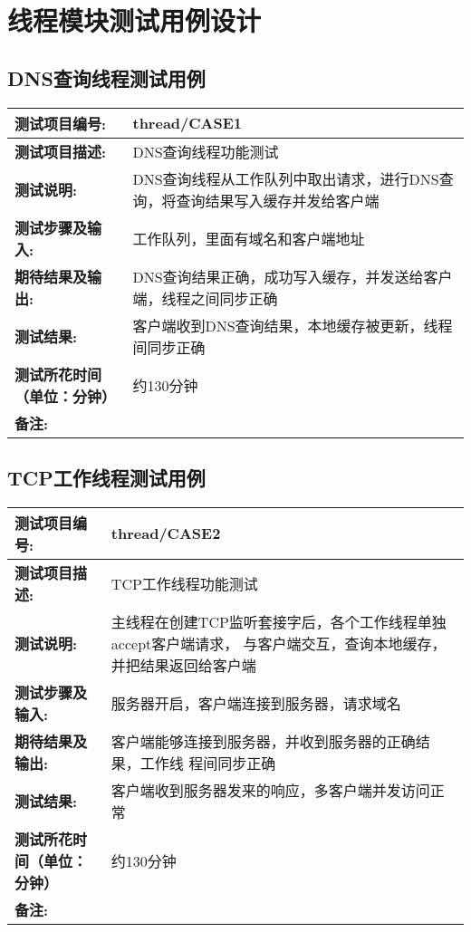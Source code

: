 %
%
\section{线程模块测试用例设计}
\subsection{DNS查询线程测试用例}

\begin{table}[H]
\centering
\begin{tabular}{|p{8em}|p{22em}|}
\hline
\textbf{测试项目编号:}&thread/CASE1\\
\hline
\textbf{测试项目描述:}&DNS查询线程功能测试\\
\hline
\textbf{测试说明:}& DNS查询线程从工作队列中取出请求，进行DNS查询，将查询结果写入缓存并发给客户端\\
\hline
\textbf{测试步骤及输入:}&工作队列，里面有域名和客户端地址\\
\hline
\textbf{期待结果及输出:}&DNS查询结果正确，成功写入缓存，并发送给客户端，线程之间同步正确\\
\hline
\textbf{测试结果:}& 客户端收到DNS查询结果，本地缓存被更新，线程间同步正确\\
\hline
\textbf{测试所花时间（单位：分钟）}& 约130分钟\\
\hline
\textbf{备注:}& \\
\hline
\end{tabular}
\end{table}

\subsection {TCP工作线程测试用例}
\begin{table}[H]
\centering
\begin{tabular}{|p{8em}|p{22em}|}
\hline
\textbf{测试项目编号:}&thread/CASE2\\
\hline
\textbf{测试项目描述:}&TCP工作线程功能测试\\
\hline
\textbf{测试说明:}&主线程在创建TCP监听套接字后，各个工作线程单独accept客户端请求，
	与客户端交互，查询本地缓存，并把结果返回给客户端\\
\hline
\textbf{测试步骤及输入:}&服务器开启，客户端连接到服务器，请求域名\\
\hline
\textbf{期待结果及输出:}&客户端能够连接到服务器，并收到服务器的正确结果，工作线
程间同步正确\\
\hline
\textbf{测试结果:}&客户端收到服务器发来的响应，多客户端并发访问正常\\
\hline
\textbf{测试所花时间（单位：分钟）}& 约130分钟\\
\hline
\textbf{备注:}& \\
\hline
\end{tabular}
\end{table}

